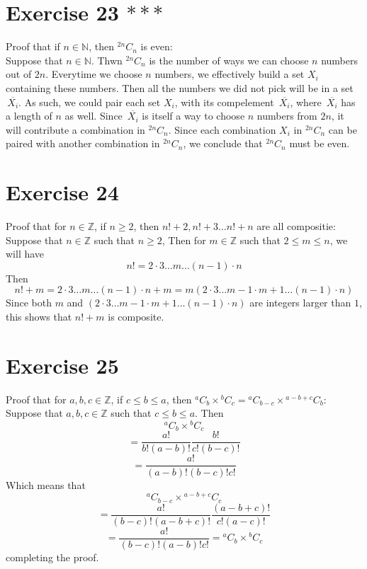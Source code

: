 \documentclass[12pt]{article}
\newcommand{\N}{\mathbb{N}}
\newcommand{\Z}{\mathbb{Z}}
\newcommand{\olsi}[1]{\,\overline{\!{#1}}}
\newcommand*{\comb}[2]{{}^{#1}C_{#2}}
\begin{document}
    \section*{Exercise 23 $***$}
    Proof that if $n \in \N$,
    then $\comb{2n}{n}$ is even: \\
    Suppose that $n \in \N$.
    Thwn $\comb{2n}{n}$ is the number of ways we can choose $n$
    numbers out of $2n$.
    Everytime we choose $n$ numbers,
    we effectively build a set $X_i$ containing these numbers.
    Then all the numbers we did not pick will be in a set $\olsi{X_i}$.
    As such, we could pair each set $X_i$,
    with its compelement $\olsi{X_i}$,
    where $\olsi{X_i}$ has a length of $n$ as well.
    Since $\olsi{X_i}$ is itself
    a way to choose $n$ numbers from $2n$,
    it will contribute a combination in $\comb{2n}{n}$.
    Since each combination $X_i$ in $\comb{2n}{n}$ can be paired
    with another combination in $\comb{2n}{n}$,
    we conclude that $\comb{2n}{n}$ must be even. \\

    \section*{Exercise 24}
    Proof that for $n \in \Z$,
    if $n \geqslant 2$,
    then $n! + 2, n! + 3 \dots n! + n$ are all compositie: \\
    Suppose that $n \in \Z$
    such that $n \geqslant 2$,
    Then for $m \in \Z$ 
    such that $2 \leqslant m \leqslant n$,
    we will have
    \[ n! = 2 \cdot 3 \dots m  \dots (n-1) \cdot n \]
    Then
    \[ n! + m = 2 \cdot 3 \dots m  \dots (n-1) \cdot n + m
    =  m (2 \cdot 3 \dots m - 1 \cdot m + 1  \dots (n-1) \cdot n) \]
    Since both $m$
    and $(2 \cdot 3 \dots m - 1 \cdot m + 1  \dots (n-1) \cdot n)$
    are integers larger than $1$,
    this shows that $n! + m$ is composite. \\

    \section*{Exercise 25}
    Proof that for $a, b, c \in \Z$,
    if $c \leqslant b \leqslant a$,
    then $\comb{a}{b} \times \comb{b}{c}
    = \comb{a}{b-c} \times \comb{a-b+c}{b}$: \\
    Suppose that $a, b, c \in \Z$
    such that $c \leqslant b \leqslant a$.
    Then
    \[ \comb{a}{b} \times \comb{b}{c} \]
    \[ = \dfrac{a!}{b!(a-b)!}\dfrac{b!}{c!(b-c)!} \]
    \[ = \dfrac{a!}{(a-b)!(b-c)!c!} \]
    Which means that
    \[ \comb{a}{b-c} \times \comb{a-b+c}{c} \]
    \[ = \dfrac{a!}{(b-c)!(a-b+c)!}\dfrac{(a-b+c)!}{c!(a-c)!} \]
    \[ = \dfrac{a!}{(b-c)!(a-b)!c!} = \comb{a}{b} \times \comb{b}{c} \]
    completing the proof. \\
\end{document}
